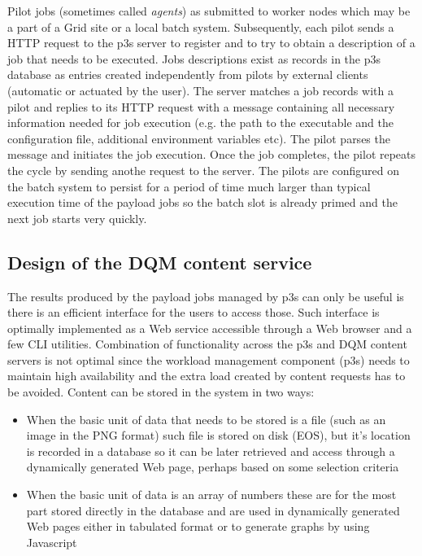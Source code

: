 \documentclass{webofc}
\begin{document}
Pilot jobs (sometimes called \textit{agents}) as submitted to worker nodes which may be
a part of a Grid site or a local batch system. Subsequently, each pilot sends a HTTP request to the p3s server
to register and to try to obtain a description of a job that needs to be executed.
Jobs descriptions exist as records in the p3s database as entries created independently from pilots by
external clients (automatic or actuated by the user). The server matches a job records with a pilot and
replies to its HTTP request with a message containing all necessary information needed for job
execution (e.g. the path to the executable and the configuration file, additional environment variables etc).
The pilot parses the message and initiates the job  execution. Once the job completes, the pilot repeats the cycle
by sending anothe request to the server. The pilots are configured on the batch system to persist for a period
of time much larger than typical execution time of the payload  jobs so the batch slot is already primed and the next
job starts very quickly.

\subsection{Design of the DQM content service}
The results produced by the payload jobs managed by p3s can only be useful is there is an efficient
interface for the users to access those. Such interface is optimally implemented
as a Web service accessible through a Web browser and a few CLI utilities. Combination of
functionality across the p3s and DQM content servers is not optimal since the workload
management component (p3s) needs to maintain high availability and the extra load created
by content requests has to be avoided. Content can be stored in the system in two ways:
\begin{itemize}

\item When the basic unit of data that needs to be stored is a file (such as an image in the PNG format) such
file is stored on disk (EOS), but it's location is recorded in a database so it can be later retrieved
and access through a dynamically generated Web page, perhaps based on some selection criteria

\item When the basic unit of data is an array of numbers these are for the most part stored directly
in the database and are used in dynamically generated Web pages either in tabulated format or
to generate graphs by using Javascript

\end{itemize}
\end{document}
